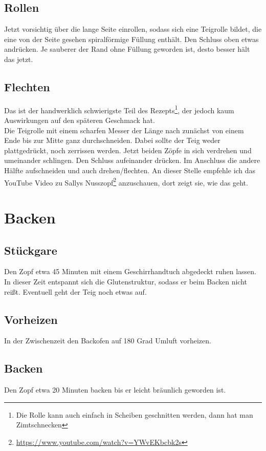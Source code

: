 \documentclass[a4paper, oneside]{recipe}
\begin{document}
\subsection*{Rollen}
Jetzt vorsichtig über die lange Seite einrollen, sodass sich eine Teigrolle bildet, die eine von der Seite gesehen spiralförmige Füllung enthält. Den Schluss oben etwas andrücken. Je sauberer der Rand ohne Füllung geworden ist, desto besser hält das jetzt.

\subsection*{Flechten}
Das ist der handwerklich schwierigste Teil des Rezepts\footnote{Die Rolle kann auch einfach in Scheiben geschnitten werden, dann hat man Zimtschnecken}, der jedoch kaum Auswirkungen auf den späteren Geschmack hat. \\
Die Teigrolle mit einem scharfen Messer der Länge nach zunächst von einem Ende bis zur Mitte ganz durchschneiden. Dabei sollte der Teig weder plattgedrückt, noch zerrissen werden. Jetzt beiden Zöpfe in sich verdrehen und umeinander schlingen. Den Schluss aufeinander drücken. Im Anschluss die andere Hälfte aufschneiden und auch drehen/flechten. An dieser Stelle empfehle ich das YouTube Video zu Sallys Nusszopf\footnote{\url{https://www.youtube.com/watch?v=YWvEKbcbk2s}} anzuschauen, dort zeigt sie, wie das geht.

\section*{Backen}
\subsection*{Stückgare}
Den Zopf etwa 45 Minuten mit einem Geschirrhandtuch abgedeckt ruhen lassen. In dieser Zeit entspannt sich die Glutenstruktur, sodass er beim Backen nicht reißt. Eventuell geht der Teig noch etwas auf.

\subsection*{Vorheizen}
In der Zwischenzeit den Backofen auf 180 Grad Umluft vorheizen.

\subsection*{Backen}
Den Zopf etwa 20 Minuten backen bis er leicht bräunlich geworden ist.
\end{document}
